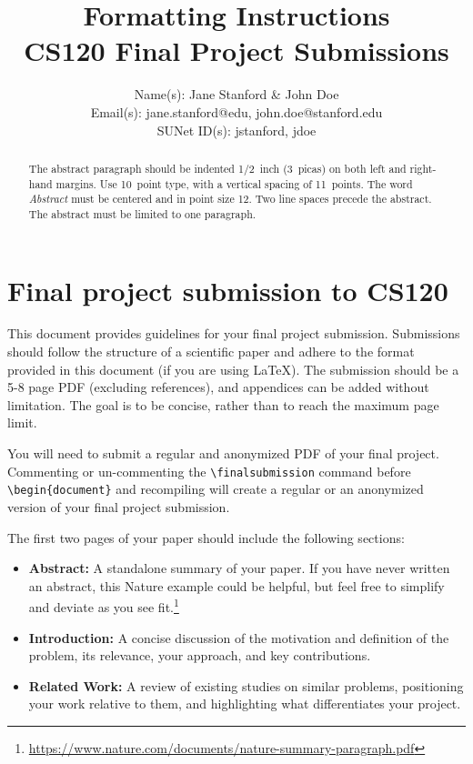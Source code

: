 \documentclass{article} %
\title{Formatting Instructions \\  CS120 Final Project Submissions}
\author{Name(s): Jane Stanford \& John Doe \\
Email(s): jane.stanford@edu, john.doe@stanford.edu\\
SUNet ID(s): jstanford, jdoe
}
\begin{document}
\maketitle

\begin{abstract}
The abstract paragraph should be indented 1/2~inch (3~picas) on both left and
right-hand margins. Use 10~point type, with a vertical spacing of 11~points.
The word \textit{Abstract} must be centered and in point size 12. Two
line spaces precede the abstract. The abstract must be limited to one
paragraph.
\end{abstract}

\section{Final project submission to CS120}

This document provides guidelines for your final project submission. Submissions should follow the structure of a scientific paper and adhere to the format provided in this document (if you are using LaTeX). The submission should be a 5-8 page PDF (excluding references), and appendices can be added without limitation. The goal is to be concise, rather than to reach the maximum page limit.

You will need to submit a regular and anonymized PDF of your final project.
Commenting or un-commenting the \verb|\finalsubmission| command before \verb|\begin{document}| and recompiling will create a regular or an anonymized version of your final project submission.

The first two pages of your paper should include the following sections:
\begin{itemize}
    \item \textbf{Abstract:} A standalone summary of your paper. If you have never written an abstract, this Nature example could be helpful, but feel free to simplify and deviate as you see fit.\footnote{\url{https://www.nature.com/documents/nature-summary-paragraph.pdf}} 
    \item \textbf{Introduction:} A concise discussion of the motivation and definition of the problem, its relevance, your approach, and key contributions.
    \item \textbf{Related Work:} A review of existing studies on similar problems, positioning your work relative to them, and highlighting what differentiates your project.
\end{itemize}
\end{document}
